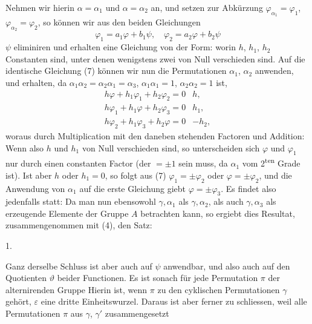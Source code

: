 Nehmen wir hierin $\alpha=\alpha_1$ und $\alpha=\alpha_2$ an, und setzen zur
Abkürzung $\varphi_{\alpha_1}=\varphi_1$, $\varphi_{\alpha_2}=\varphi_2$, so
können wir aus den beiden Gleichungen
\[
\varphi_1 = a_1\varphi + b_1\psi, \quad \varphi_2 = a_2\varphi + b_2\psi
\]
$\psi$ eliminiren und erhalten eine Gleichung von der Form:
worin $h$, $h_1$, $h_2$ Constanten sind, unter denen wenigstens zwei von
Null verschieden sind. Auf die identische Gleichung (7) können wir nun die
Permutationen $\alpha_1$, $\alpha_2$ anwenden, und erhalten, da
$\alpha_1\alpha_2 = \alpha_2\alpha_1 = \alpha_3$, $\alpha_1\alpha_1 = 1$,
$\alpha_2\alpha_2 = 1$ ist,
\[
\begin{array}{l|l}
h\varphi + h_1\varphi_1 + h_2\varphi_2 = 0 & h,\\
h\varphi_1 + h_1\varphi + h_2\varphi_3 = 0 & h_1,\\
h\varphi_2 + h_1\varphi_3 + h_2\varphi = 0 & -h_2,
\end{array}
\]
woraus durch Multiplication mit den daneben stehenden Factoren und
Addition:
Wenn also $h$ und $h_1$ von Null verschieden sind, so unterscheiden sich
$\varphi$ und $\varphi_1$ nur durch einen constanten Factor (der $=\pm 1$
sein muss, da $\alpha_1$ vom 2\textsuperscript{ten} Grade ist). Ist aber
$h$ oder $h_1=0$, so folgt aus (7) $\varphi_1=\pm\varphi_2$ oder
$\varphi=\pm\varphi_2$, und die Anwendung von $\alpha_1$ auf die erste
Gleichung giebt $\varphi=\pm\varphi_3$. Es findet also jedenfalls  statt:
Da man nun ebensowohl $\gamma,\alpha_1$ als $\gamma,\alpha_2$, als auch
$\gamma,\alpha_3$ als erzeugende Elemente der Gruppe $A$ betrachten kann,
so ergiebt dies Resultat, zusammengenommen mit (4), den Satz:

1. 

Ganz derselbe Schluss ist aber auch auf $\psi$ anwendbar, und also auch
auf den Quotienten $\vartheta$ beider Functionen. Es ist sonach für jede
Permutation $\pi$ der alternirenden Gruppe
Hierin ist, wenn $\pi$ zu den cyklischen Permutationen $\gamma$ gehört,
$\varepsilon$ eine dritte Einheitswurzel. Daraus ist aber ferner zu
schliessen, weil alle Permutationen $\pi$ aus $\gamma$, $\gamma'$
zusammengesetzt
